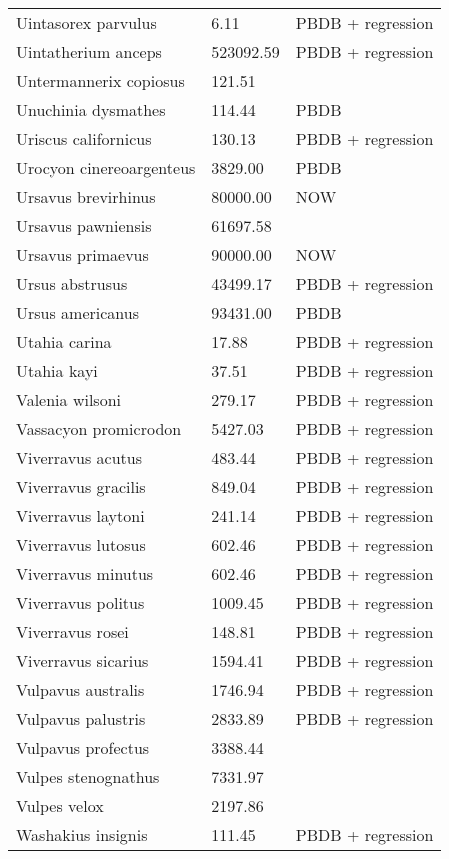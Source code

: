 \documentclass{article}
\begin{document}
\begin{center}
\begin{longtable}{p{} p{} p{} }
  Uintasorex parvulus & 6.11 & PBDB + regression \\ 
  Uintatherium anceps & 523092.59 & PBDB + regression \\ 
  Untermannerix copiosus & 121.51 & \cite{Tomiya2013} \\ 
  Unuchinia dysmathes & 114.44 & PBDB \\ 
  Uriscus californicus & 130.13 & PBDB + regression \\ 
  Urocyon cinereoargenteus & 3829.00 & PBDB \\ 
  Ursavus brevirhinus & 80000.00 & NOW \\ 
  Ursavus pawniensis & 61697.58 & \cite{Tomiya2013} \\ 
  Ursavus primaevus & 90000.00 & NOW \\ 
  Ursus abstrusus & 43499.17 & PBDB + regression \\ 
  Ursus americanus & 93431.00 & PBDB \\ 
  Utahia carina & 17.88 & PBDB + regression \\ 
  Utahia kayi & 37.51 & PBDB + regression \\ 
  Valenia wilsoni & 279.17 & PBDB + regression \\ 
  Vassacyon promicrodon & 5427.03 & PBDB + regression \\ 
  Viverravus acutus & 483.44 & PBDB + regression \\ 
  Viverravus gracilis & 849.04 & PBDB + regression \\ 
  Viverravus laytoni & 241.14 & PBDB + regression \\ 
  Viverravus lutosus & 602.46 & PBDB + regression \\ 
  Viverravus minutus & 602.46 & PBDB + regression \\ 
  Viverravus politus & 1009.45 & PBDB + regression \\ 
  Viverravus rosei & 148.81 & PBDB + regression \\ 
  Viverravus sicarius & 1594.41 & PBDB + regression \\ 
  Vulpavus australis & 1746.94 & PBDB + regression \\ 
  Vulpavus palustris & 2833.89 & PBDB + regression \\ 
  Vulpavus profectus & 3388.44 & \cite{Williamson2013} \\ 
  Vulpes stenognathus & 7331.97 & \cite{Tomiya2013} \\ 
  Vulpes velox & 2197.86 & \cite{Smith2004} \\ 
  Washakius insignis & 111.45 & PBDB + regression \\ 

\end{longtable}
\end{center}
\end{document}
